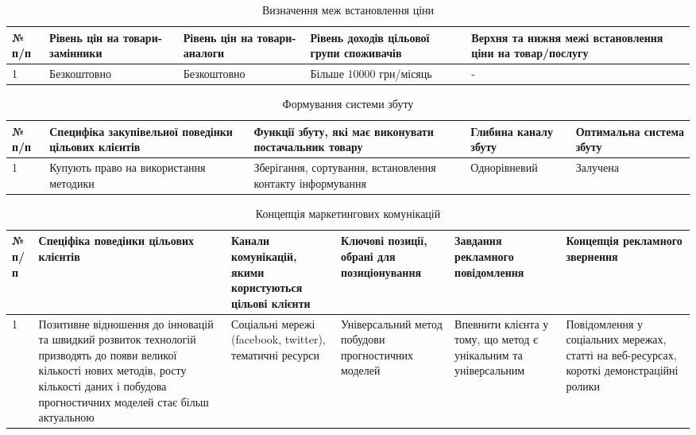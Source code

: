 \begin{table}
	\begin{tabularx}{\textwidth}{|l|X|X|X|X|}
    \hline
    № п/п & Рівень цін на товари-замінники & Рівень цін на товари-аналоги & Рівень доходів цільової групи споживачів & Верхня та нижня межі встановлення ціни на товар/послугу \\ \hline
    1 & Безкоштовно & Безкоштовно & Більше 10000 грн/місяць & - \\
    \hline
    \end{tabularx}
\caption{Визначення меж встановлення ціни} \label{tab:sometab}
\end{table}

\begin{table}
	\begin{tabularx}{\textwidth}{|l|X|X|X|X|}
    \hline
    № п/п & Специфіка закупівельної поведінки цільових клієнтів & Функції збуту, які має виконувати постачальник товару & Глибина каналу збуту & Оптимальна система збуту \\ \hline
    1 & Купують право на використання методики & Зберігання, сортування, встановлення контакту інформування & Однорівневий & Залучена \\
    \hline
    \end{tabularx}
\caption{Формування системи збуту} \label{tab:sometab}
\end{table}


\begin{table}
	\begin{tabularx}{\textwidth}{|l|X|X|X|X|X|}
    \hline
    № п/п & Спеціфіка поведінки цільових клієнтів & Канали комунікацій, якими користуються цільові клієнти & Ключові позиції, обрані для позиціонування & Завдання рекламного повідомлення & Концепція рекламного звернення \\ \hline
    1 & Позитивне відношення до інновацій та швидкий розвиток технологій призводять до появи великої кількості нових методів, росту кількості даних і побудова прогностичних моделей стає більш актуальною & Соціальні мережі (facebook, twitter), тематичні ресурси & Універсальний метод побудови прогностичних моделей & Впевнити клієнта у тому, що метод є унікальним та універсальним & Повідомлення у соціальних мережах, статті на веб-ресурсах, короткі демонстраційні ролики \\
    \hline
    \end{tabularx}
\caption{Концепція маркетингових комунікацій} \label{tab:sometab}
\end{table}


